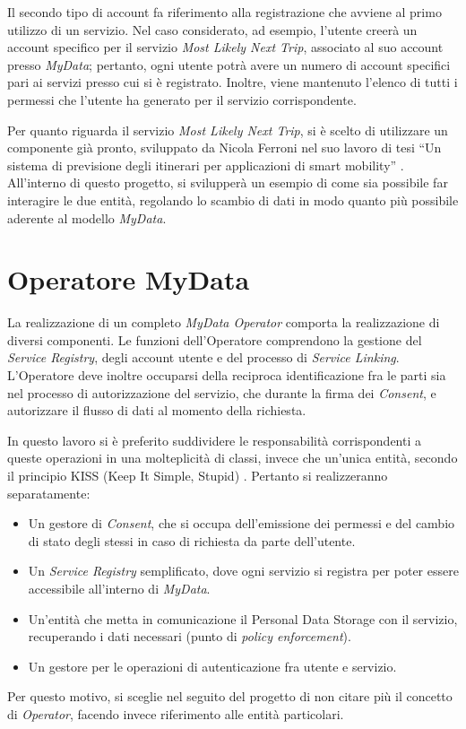Il secondo tipo di account fa riferimento alla registrazione che avviene al primo utilizzo di un servizio. Nel caso considerato, ad esempio, l’utente creer\`a un account specifico per il servizio \textit{Most Likely Next Trip}, associato al suo account presso \textit{MyData}; pertanto, ogni utente potr\`a avere un numero di account specifici pari ai servizi presso cui si \`e registrato. Inoltre, viene mantenuto l’elenco di tutti i permessi che l’utente ha generato per il servizio corrispondente.

Per quanto riguarda il servizio \textit{Most Likely Next Trip}, si \`e scelto di utilizzare un componente gi\`a pronto, sviluppato da Nicola Ferroni nel suo lavoro di tesi “Un sistema di previsione degli itinerari per applicazioni di smart mobility” \cite{MLNT}.  All’interno di questo progetto, si svilupper\`a un esempio di come sia possibile far interagire le due entit\`a, regolando lo scambio di dati in modo quanto pi\`u possibile aderente al modello \textit{MyData}.

\section{Operatore MyData}
\label{sec:A-mydataop}
La realizzazione di un completo \textit{MyData Operator} comporta la realizzazione di diversi componenti. Le funzioni dell’Operatore comprendono la gestione del \textit{Service Registry}, degli account utente e del processo di \textit{Service Linking}. L’Operatore deve inoltre occuparsi della reciproca identificazione fra le parti sia nel processo di autorizzazione del servizio, che durante la firma dei \textit{Consent}, e autorizzare il flusso di dati al momento della richiesta.

In questo lavoro si \`e preferito suddividere le responsabilit\`a corrispondenti a queste operazioni in una molteplicit\`a di classi, invece che un’unica entit\`a, secondo il principio KISS (Keep It Simple, Stupid) \cite{kissprinciple}. Pertanto si realizzeranno separatamente:
\begin{itemize}
	\item Un gestore di \textit{Consent}, che si occupa dell’emissione dei permessi e del cambio di stato degli stessi in caso di richiesta da parte dell’utente.
	\item Un \textit{Service Registry} semplificato, dove ogni servizio si registra per poter essere accessibile all’interno di \textit{MyData}.
	\item Un’entit\`a che metta in comunicazione il Personal Data Storage con il servizio, recuperando i dati necessari (punto di \textit{policy enforcement}).
	\item Un gestore per le operazioni di autenticazione fra utente e servizio.
\end{itemize}
Per questo motivo, si sceglie nel seguito del progetto di non citare pi\`u il concetto di \textit{Operator}, facendo invece riferimento alle entit\`a particolari.

